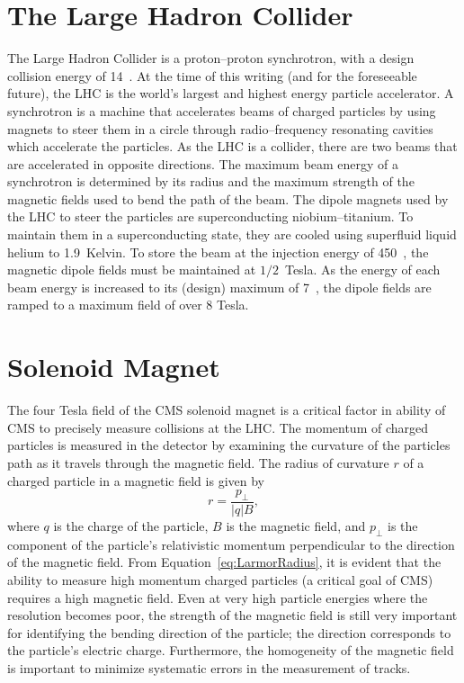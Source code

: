 \section{The Large Hadron Collider}
The Large Hadron Collider is a proton--proton synchrotron, with a design
collision energy of 14~\TeV.  At the time of this writing (and for the
foreseeable future), the LHC is the world's largest and highest energy particle
accelerator. A synchrotron is a machine that accelerates beams of charged
particles by using magnets to steer them in a circle through radio--frequency
resonating cavities which accelerate the particles. As the LHC is a collider,
there are two beams that are accelerated in opposite directions.  The maximum
beam energy of a synchrotron is determined by its radius and the maximum
strength of the magnetic fields used to bend the path of the beam.  The dipole
magnets used by the LHC to steer the particles are superconducting
niobium--titanium.  To maintain them in a superconducting state, they are cooled
using superfluid liquid helium to 1.9~Kelvin.  To store the beam at the
injection energy of 450~\GeV, the magnetic dipole fields must be maintained at
$1/2$~Tesla.  As the energy of each beam energy is increased to its (design)
maximum of 7~\TeV, the dipole fields are ramped to a maximum field of over 8
Tesla.
\section{Solenoid Magnet}
\label{sec:Magnet}
The four Tesla field of the CMS solenoid magnet is a critical factor in ability
of CMS to precisely measure collisions at the LHC\@. The momentum of charged
particles is measured in the detector by examining the curvature of the
particles path as it travels through the magnetic field.  The radius of
curvature $r$ of a charged particle in a magnetic field is given by
\begin{equation}
  r = \frac{p_\perp}{|q| B},
  \label{eq:LarmorRadius}
\end{equation}
where $q$ is the charge of the particle, $B$ is the magnetic field, and
$p_\perp$ is the component of the particle's relativistic momentum perpendicular
to the direction of the magnetic field.  From Equation~\ref{eq:LarmorRadius}, it
is evident that the ability to measure high momentum charged particles (a
critical goal of CMS) requires a high magnetic field.  Even at very high
particle energies where the resolution becomes poor, the strength of the
magnetic field is still very important for identifying the bending direction of
the particle; the direction corresponds to the particle's electric charge.
Furthermore, the homogeneity of the magnetic field is important to minimize
systematic errors in the measurement of tracks.

